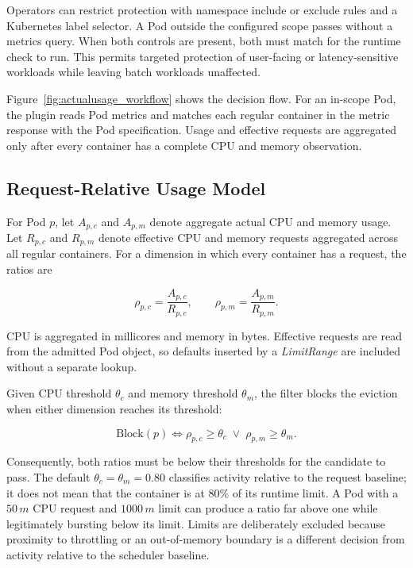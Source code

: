 Operators can restrict protection with namespace include or exclude rules and
a Kubernetes label selector. A Pod outside the configured scope passes without
a metrics query. When both controls are present, both must match for the
runtime check to run. This permits targeted protection of user-facing or
latency-sensitive workloads while leaving batch workloads unaffected.

Figure~\ref{fig:actualusage_workflow} shows the decision flow. For an in-scope
Pod, the plugin reads Pod metrics and matches each regular container in the
metric response with the Pod specification. Usage and effective requests are
aggregated only after every container has a complete CPU and memory
observation.

\subsection{Request-Relative Usage Model}

For Pod \(p\), let \(A_{p,c}\) and \(A_{p,m}\) denote aggregate actual CPU and
memory usage. Let \(R_{p,c}\) and \(R_{p,m}\) denote effective CPU and memory
requests aggregated across all regular containers. For a dimension in which
every container has a request, the ratios are

\[
\rho_{p,c}=\frac{A_{p,c}}{R_{p,c}},
\qquad
\rho_{p,m}=\frac{A_{p,m}}{R_{p,m}}.
\]

CPU is aggregated in millicores and memory in bytes. Effective requests are
read from the admitted Pod object, so defaults inserted by a
\textit{LimitRange} are included without a separate lookup.

Given CPU threshold \(\theta_c\) and memory threshold \(\theta_m\), the filter
blocks the eviction when either dimension reaches its threshold:

\[
\mathrm{Block}(p)
\iff
\rho_{p,c}\geq\theta_c
\;\lor\;
\rho_{p,m}\geq\theta_m.
\]

Consequently, both ratios must be below their thresholds for the candidate to
pass. The default \(\theta_c=\theta_m=0.80\) classifies activity relative to
the request baseline; it does not mean that the container is at \(80\%\) of
its runtime limit. A Pod with a \(50\,m\) CPU request and \(1000\,m\) limit can
produce a ratio far above one while legitimately bursting below its limit.
Limits are deliberately excluded because proximity to throttling or an
out-of-memory boundary is a different decision from activity relative to the
scheduler baseline.

